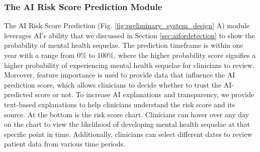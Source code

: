 \subsubsection{The AI Risk Score Prediction Module}
The AI Risk Score Prediction (Fig. \ref{fig:preliminary_system_design} A) module leverages AI's ability that we discussed in Section \ref{sec:aifordetection} to show the probability of mental health sequelae.
The prediction timeframe is within one year with a range from 0\% to 100\%, where the higher probability score signifies a higher probability of experiencing mental health sequelae for clinicians to review. 
Moreover, feature importance is used to provide data that influence the AI prediction score, which allows clinicians to decide whether to trust the AI-predicted score or not. 
To increase AI explanations and transparency, we provide text-based explanations to help clinicians understand the risk score and its source. 
At the bottom is the risk score chart. Clinicians can hover over any day on the chart to view the likelihood of developing mental health sequelae at that specific point in time. Additionally, clinicians can select different dates to review patient data from various time periods. 





